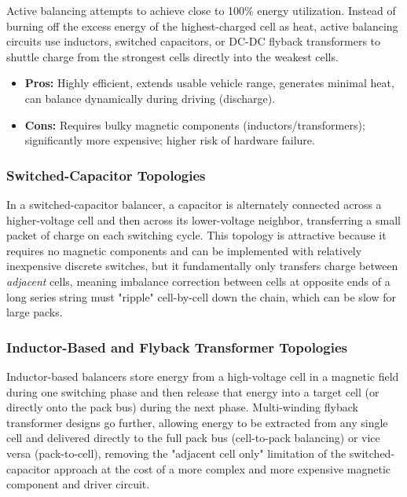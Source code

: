 Active balancing attempts to achieve close to 100\% energy utilization. Instead of burning off the excess energy of the highest-charged cell as heat, active balancing circuits use inductors, switched capacitors, or DC-DC flyback transformers to shuttle charge from the strongest cells directly into the weakest cells.

\begin{itemize}
    \item \textbf{Pros:} Highly efficient, extends usable vehicle range, generates minimal heat, can balance dynamically during driving (discharge).
    \item \textbf{Cons:} Requires bulky magnetic components (inductors/transformers); significantly more expensive; higher risk of hardware failure.
\end{itemize}

\subsubsection{Switched-Capacitor Topologies}
\label{subsubsec:14_switched_cap}

In a switched-capacitor balancer, a capacitor is alternately connected across a higher-voltage cell and then across its lower-voltage neighbor, transferring a small packet of charge on each switching cycle. This topology is attractive because it requires no magnetic components and can be implemented with relatively inexpensive discrete switches, but it fundamentally only transfers charge between \emph{adjacent} cells, meaning imbalance correction between cells at opposite ends of a long series string must "ripple" cell-by-cell down the chain, which can be slow for large packs.

\subsubsection{Inductor-Based and Flyback Transformer Topologies}
\label{subsubsec:14_inductor}

Inductor-based balancers store energy from a high-voltage cell in a magnetic field during one switching phase and then release that energy into a target cell (or directly onto the pack bus) during the next phase. Multi-winding flyback transformer designs go further, allowing energy to be extracted from any single cell and delivered directly to the full pack bus (cell-to-pack balancing) or vice versa (pack-to-cell), removing the "adjacent cell only" limitation of the switched-capacitor approach at the cost of a more complex and more expensive magnetic component and driver circuit.

